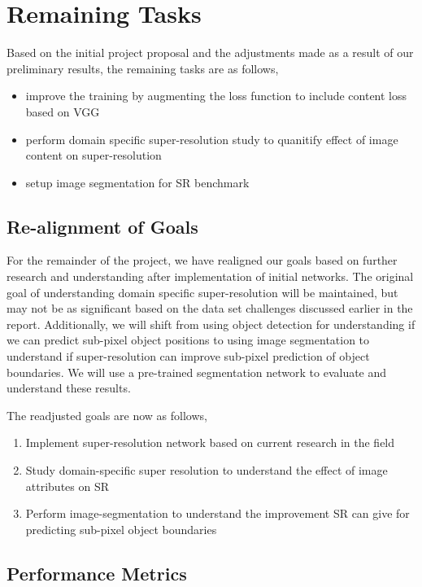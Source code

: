 \documentclass{article}
\begin{document}
\section{Remaining Tasks}
Based on the initial project proposal and the adjustments made as a result of our preliminary results, the remaining tasks are as follows,
\begin{itemize}
    \item improve the training by augmenting the loss function to include content loss based on VGG
    \item perform domain specific super-resolution study to quanitify effect of image content on super-resolution
    \item setup image segmentation for SR benchmark
\end{itemize}



\subsection{Re-alignment of Goals}
For the remainder of the project, we have realigned our goals based on further research and understanding after implementation of initial networks. The original goal of understanding domain specific super-resolution will be maintained, but may not be as significant based on the data set challenges discussed earlier in the report. Additionally, we will shift from using object detection for understanding if we can predict sub-pixel object positions to using image segmentation to understand if super-resolution can improve sub-pixel prediction of object boundaries. We will use a pre-trained segmentation network to evaluate and understand these results.

The readjusted goals are now as follows,

\begin{enumerate}
    \item Implement super-resolution network based on current research in the field
    \item Study domain-specific super resolution to understand the effect of image attributes on SR
    \item Perform image-segmentation to understand the improvement SR can give for predicting sub-pixel object boundaries
\end{enumerate}

\subsection{Performance Metrics}
\end{document}
